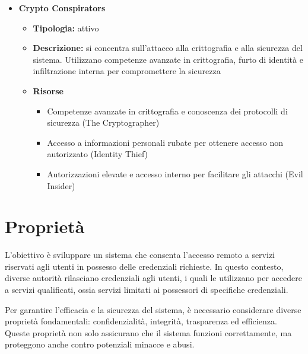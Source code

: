 \begin{itemize}
            \item \textbf{Crypto Conspirators}
                \begin{itemize}
                    \item \textbf{Tipologia:} attivo
    
                    \item \textbf{Descrizione:} si concentra sull'attacco alla crittografia e alla sicurezza del sistema.
                    Utilizzano competenze avanzate in crittografia, furto di identità e infiltrazione interna per compromettere la sicurezza
    
                    \item \textbf{Risorse}
                        \begin{itemize}
                            \item Competenze avanzate in crittografia e conoscenza dei protocolli di sicurezza (The Cryptographer)
                            
                            \vspace{3mm}
    
                            \item Accesso a informazioni personali rubate per ottenere accesso non autorizzato (Identity Thief)
    
                            \vspace{3mm}
    
                            \item Autorizzazioni elevate e accesso interno per facilitare gli attacchi (Evil Insider)
                        \end{itemize}
                \end{itemize}
        \end{itemize}
    
    
    \section{Proprietà}
        L'obiettivo è sviluppare un sistema che consenta l'accesso remoto a servizi riservati agli utenti in possesso delle credenziali richieste.
        In questo contesto, diverse autorità rilasciano credenziali agli utenti, i quali le utilizzano per accedere a servizi qualificati, ossia servizi limitati ai possessori di specifiche credenziali.
        
        Per garantire l'efficacia e la sicurezza del sistema, è necessario considerare diverse proprietà fondamentali: confidenzialità, integrità, trasparenza ed efficienza.
        Queste proprietà non solo assicurano che il sistema funzioni correttamente, ma proteggono anche contro potenziali minacce e abusi.
        
